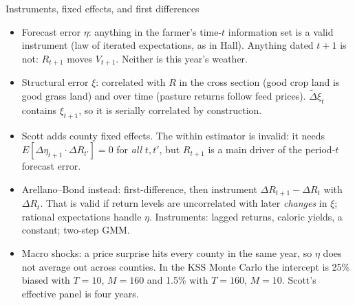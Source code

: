 \documentclass[aspectratio=169,11pt]{beamer}
\begin{document}
\begin{frame}{Instruments, fixed effects, and first differences}
\small
\begin{itemize}
\item \alert{Forecast error $\eta$}: anything in the farmer's time-$t$ information set is a valid instrument (law of iterated expectations, as in Hall). Anything dated $t+1$ is not: $R_{t+1}$ moves $V_{t+1}$. Neither is this year's weather.
\item \alert{Structural error $\xi$}: correlated with $R$ in the cross section (good crop land is good grass land) and over time (pasture returns follow feed prices). $\tilde\Delta\xi_t$ contains $\xi_{t+1}$, so it is serially correlated by construction.
\item Scott adds county fixed effects. The \alert{within estimator is invalid}: it needs $E[\Delta\eta_{t+1} \cdot \Delta R_{t'}] = 0$ for \emph{all} $t, t'$, but $R_{t+1}$ is a main driver of the period-$t$ forecast error.
\item Arellano--Bond instead: first-difference, then instrument $\Delta R_{t+1} - \Delta R_t$ with $\Delta R_t$. That is valid if return levels are uncorrelated with later \emph{changes} in $\xi$; rational expectations handle $\eta$. Instruments: lagged returns, caloric yields, a constant; two-step GMM.
\item \alert{Macro shocks}: a price surprise hits every county in the same year, so $\eta$ does not average out across counties. In the KSS Monte Carlo the intercept is 25\% biased with $T=10$, $M=160$ and 1.5\% with $T=160$, $M=10$. Scott's effective panel is four years.
\end{itemize}
\end{frame}
\end{document}
